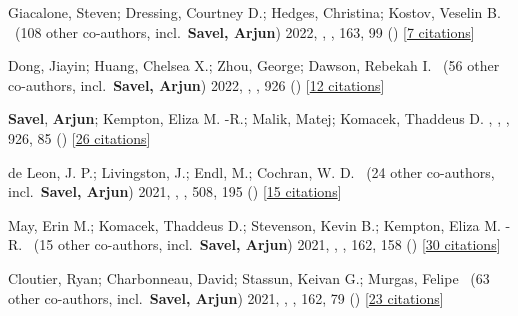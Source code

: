 \item[{\color{numcolor}\scriptsize10}] Giacalone, Steven; Dressing, Courtney D.; Hedges, Christina; Kostov, Veselin B. \etal\ ({108} other co-authors, incl.\ \textbf{Savel, Arjun}) 2022, , \aj, {163}, 99 () [\href{https://ui.adsabs.harvard.edu/abs/2022AJ....163...99G}{7 citations}]

\item[{\color{numcolor}\scriptsize9}] Dong, Jiayin; Huang, Chelsea X.; Zhou, George; Dawson, Rebekah I. \etal\ ({56} other co-authors, incl.\ \textbf{Savel, Arjun}) 2022, , \apj, {926} () [\href{https://ui.adsabs.harvard.edu/abs/2022ApJ...926L...7D}{12 citations}]

\item[{\color{numcolor}\scriptsize8}] \textbf{Savel}, \textbf{Arjun}; Kempton, Eliza M. -R.; Malik, Matej; Komacek, Thaddeus D. , , \apj, {926}, 85 () [\href{https://ui.adsabs.harvard.edu/abs/2022ApJ...926...85S}{26 citations}]

\item[{\color{numcolor}\scriptsize7}] de Leon, J. P.; Livingston, J.; Endl, M.; Cochran, W. D. \etal\ ({24} other co-authors, incl.\ \textbf{Savel, Arjun}) 2021, , \mnras, {508}, 195 () [\href{https://ui.adsabs.harvard.edu/abs/2021MNRAS.508..195D}{15 citations}]

\item[{\color{numcolor}\scriptsize6}] May, Erin M.; Komacek, Thaddeus D.; Stevenson, Kevin B.; Kempton, Eliza M. -R. \etal\ ({15} other co-authors, incl.\ \textbf{Savel, Arjun}) 2021, , \aj, {162}, 158 () [\href{https://ui.adsabs.harvard.edu/abs/2021AJ....162..158M}{30 citations}]

\item[{\color{numcolor}\scriptsize5}] Cloutier, Ryan; Charbonneau, David; Stassun, Keivan G.; Murgas, Felipe \etal\ ({63} other co-authors, incl.\ \textbf{Savel, Arjun}) 2021, , \aj, {162}, 79 () [\href{https://ui.adsabs.harvard.edu/abs/2021AJ....162...79C}{23 citations}]

